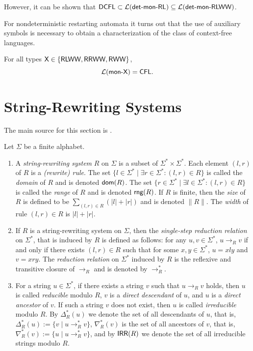 \noindent However, it can be shown that   $\DCFL \subset \calL{\detmonRL} \subseteq \calL{\detmonRLWW}$.

For nondeterministic restarting automata it turns out that the use of auxiliary symbols is necessary to obtain a characterization of the class of context-free languages.

\index{$\CFL$}
\begin{theorem}
For all types $\mbox{\sf X} \in \{\mbox{\sf RLWW}, \mbox{\sf RRWW}, \mbox{\sf RWW}\}$, $$\calL{\monX} = \CFL.$$
\end{theorem}

\section{String-Rewriting Systems}
\label{section:string-rewriting-systems}

The main source for this section is \cite{bookOtto93}.

\begin{definition}
Let $\Sigma$ be a finite alphabet.

\begin{enumerate}
\item A \emph{string-rewriting system} $R$ on $\Sigma$ is a subset of $\Sigma^* \times \Sigma^*$. Each element $(l, r)$ of $R$ is a \emph{(rewrite) rule}. The set $\{l \in \Sigma^* \mid \exists 
r \in \Sigma^*: (l, r) \in R\}$ is called the \emph{domain} of $R$ and is denoted $\dom(R)$. The set $\{r \in \Sigma^* \mid \exists l \in \Sigma^*: (l, r) \in R\}$ is called the \emph{range} of $R$ and is denoted $\rng(R)$. If $R$ is finite, then the \emph{size} of $R$ is defined to be $\sum_{(l,r) \in R}(|l| + |r|)$ and is denoted $\|R\|$. The \emph{width} of rule $(l,r) \in R$ is $|l| + |r|$.
\item If $R$ is a string-rewriting system on $\Sigma$, then the \emph{single-step reduction relation} on $\Sigma^*$, that is induced by $R$ is defined as follows: for any $u, v \in \Sigma^*$, $u \to_R v$ if and only if there exists $(l, r) \in R$ such that for some $x, y \in \Sigma^*$, $u = xly$ and $v = xry$. The \emph{reduction relation} on $\Sigma^*$ induced by $R$ is the reflexive and transitive closure of $\to_R$ and is denoted by $\to^*_R$.
\item For a string $u \in \Sigma^*$, if there exists a string $v$ such that $u \to_R v$ holds, then $u$ is called \emph{reducible} modulo $R$, $v$ is a \emph{direct descendant} of $u$, and $u$ is a \emph{direct ancestor} of $v$. If such a string $v$ does not exist, then $u$ is called \emph{irreducible} modulo $R$. By $\Delta_R^*(u)$ we denote the set of all descendants of $u$, that is, $\Delta_R^*(u) := \{v \mid u \to_R^* v\}$, $\nabla_R^*(v)$ is the set of all ancestors of $v$, that is, $\nabla_R^*(v) := \{u \mid u \to_R^* v\}$, and by $\IRR(R)$ we denote the set of all irreducible strings modulo $R$.
\end{enumerate}
\end{definition}

